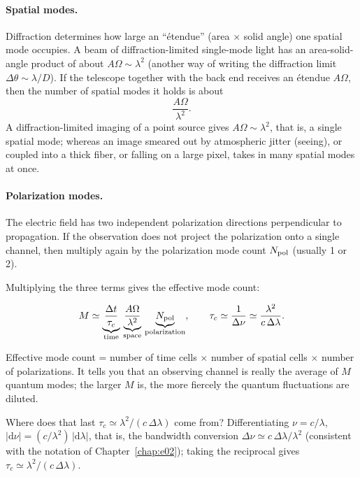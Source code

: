 \paragraph{Spatial modes.} Diffraction determines how large an ``\'etendue'' (area \(\times\) solid angle) one spatial mode occupies. A beam of diffraction-limited single-mode light has an area-solid-angle product of about \(A\Omega\sim\lambda^2\) (another way of writing the diffraction limit \(\Delta\theta\sim\lambda/D\)). If the telescope together with the back end receives an \'etendue \(A\Omega\), then the number of spatial modes it holds is about
\[
  \frac{A\Omega}{\lambda^2}.
\]
A diffraction-limited imaging of a point source gives \(A\Omega\sim\lambda^2\), that is, a single spatial mode; whereas an image smeared out by atmospheric jitter (seeing), or coupled into a thick fiber, or falling on a large pixel, takes in many spatial modes at once.

\paragraph{Polarization modes.} The electric field has two independent polarization directions perpendicular to propagation. If the observation does not project the polarization onto a single channel, then multiply again by the polarization mode count \(N_{\rm pol}\) (usually 1 or 2).

Multiplying the three terms gives the effective mode count:

\begin{equation}
  M\simeq
  \underbrace{\frac{\Delta t}{\tau_c}}_{\text{time}}\,
  \underbrace{\frac{A\Omega}{\lambda^2}}_{\text{space}}\,
  \underbrace{N_{\rm pol}}_{\text{polarization}},
  \qquad
  \tau_c\simeq\frac1{\Delta\nu}\simeq\frac{\lambda^2}{c\,\Delta\lambda}.
  \label{eq:e05-mode-number}
\end{equation}
\begin{formulaexplain}
Effective mode count = number of time cells \(\times\) number of spatial cells \(\times\) number of polarizations. It tells you that an observing channel is really the average of \(M\) quantum modes; the larger \(M\) is, the more fiercely the quantum fluctuations are diluted.
\end{formulaexplain}

Where does that last \(\tau_c\simeq\lambda^2/(c\,\Delta\lambda)\) come from? Differentiating \(\nu=c/\lambda\), \(|\mathrm d\nu|=(c/\lambda^2)\,|\mathrm d\lambda|\), that is, the bandwidth conversion \(\Delta\nu\simeq c\,\Delta\lambda/\lambda^2\) (consistent with the notation of Chapter~\ref{chap:e02}); taking the reciprocal gives \(\tau_c\simeq\lambda^2/(c\,\Delta\lambda)\).


